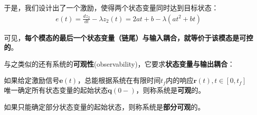 \begin{example}
    于是，我们设计出了一个激励，使得两个状态变量同时达到目标状态：\begin{align*}
        e(t)=\frac{d z_2}{dt}-\lambda z_2(t)=2at+b-\lambda (a t^2+bt)
    \end{align*}
\end{example}

可见，\textbf{每个模态的最后一个状态变量（链尾）与输入耦合，就等价于该模态是可控的}。

与之类似的还有系统的\textbf{可观性}(observability)，它要求\textbf{状态变量与输出耦合}：

\begin{definition}[可观性]
    如果给定激励信号$\mathbf{e}(t)$，总能根据系统在有限时间$t_f$内的响应$\mathbf{r}(t),t\in[0,t_f]$唯一确定所有状态变量的起始状态$\mathbf{q}(0-)$，则称系统是\textbf{可观}的。

    如果只能确定部分状态变量的起始状态，则称系统是\textbf{部分可观}的。
\end{definition}

